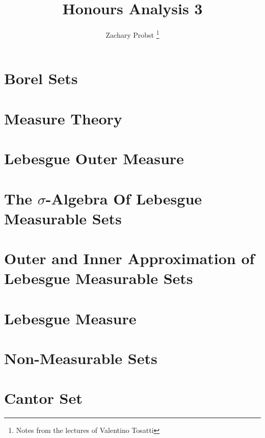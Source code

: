 \documentclass[11pt]{article}
\title{Honours Analysis 3}
\author{Zachary Probst \thanks{Notes from the lectures of Valentino Tosatti}}
\begin{document}
    \maketitle


    \section{Borel Sets}\label{sec:borel-sets}
    


    \section{Measure Theory}\label{sec:measure-theory}
    


    \section{Lebesgue Outer Measure}\label{sec:lebesgue-outer-measure}
    


    \section{The $\sigma$-Algebra Of Lebesgue Measurable Sets}\label{sec:the-$sigma$-algebra-of-lebesgue-measurable-sets}
    


    \section{Outer and Inner Approximation of Lebesgue Measurable Sets}\label{sec:outer-and-inner-approximation-of-lebesgue-measureable-sets}
    


    \section{Lebesgue Measure}\label{sec:lebesgue-measure}
    


    \section{Non-Measurable Sets}\label{sec:non-measurable-sets}
    

    \section{Cantor Set}\label{sec:cantor-set}
    
\end{document}
